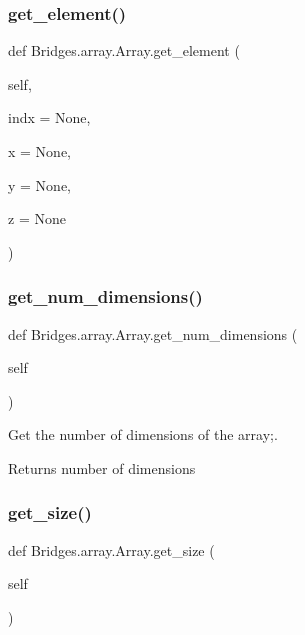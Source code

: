 \subsubsection{\texorpdfstring{get\+\_\+element()}{get\_element()}}
{\footnotesize\ttfamily def Bridges.\+array.\+Array.\+get\+\_\+element (\begin{DoxyParamCaption}\item[{}]{self,  }\item[{}]{indx = {\ttfamily None},  }\item[{}]{x = {\ttfamily None},  }\item[{}]{y = {\ttfamily None},  }\item[{}]{z = {\ttfamily None} }\end{DoxyParamCaption})}

\mbox{\label{class_bridges_1_1array_1_1_array_abfebdd85d851c303279872803e67c0aa}} 
\subsubsection{\texorpdfstring{get\+\_\+num\+\_\+dimensions()}{get\_num\_dimensions()}}
{\footnotesize\ttfamily def Bridges.\+array.\+Array.\+get\+\_\+num\+\_\+dimensions (\begin{DoxyParamCaption}\item[{}]{self }\end{DoxyParamCaption})}



Get the number of dimensions of the array;. 

\begin{DoxyReturn}{Returns}
number of dimensions 
\end{DoxyReturn}
\mbox{\label{class_bridges_1_1array_1_1_array_ac61f92d0248dd8b39383a050878219fb}} 
\subsubsection{\texorpdfstring{get\+\_\+size()}{get\_size()}}
{\footnotesize\ttfamily def Bridges.\+array.\+Array.\+get\+\_\+size (\begin{DoxyParamCaption}\item[{}]{self }\end{DoxyParamCaption})}




